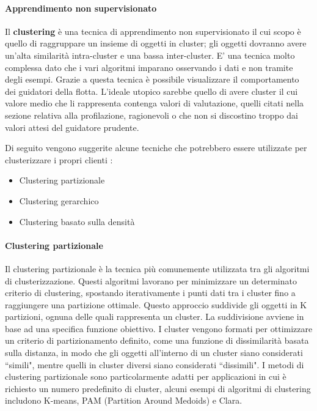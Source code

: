 \documentclass[12pt, a4paper, italian]{report}
\numberwithin{figure}{chapter}
\numberwithin{table}{chapter}
\begin{document}
\paragraph{Apprendimento non supervisionato}
Il \textbf{clustering} è una tecnica di apprendimento non supervisionato il cui scopo è quello di raggruppare un insieme di oggetti in cluster; gli oggetti dovranno avere un'alta similarità intra-cluster e una bassa inter-cluster. E' una tecnica molto complessa dato che i vari algoritmi imparano osservando i dati e non tramite degli esempi. Grazie a questa tecnica è possibile visualizzare il comportamento dei guidatori della flotta. L'ideale utopico sarebbe quello di avere cluster il cui valore medio che li rappresenta contenga valori di valutazione, quelli citati nella sezione relativa alla profilazione, ragionevoli o che non si discostino troppo dai valori attesi del guidatore prudente.

\vspace{0.5cm}
Di seguito vengono suggerite alcune tecniche che potrebbero essere utilizzate per clusterizzare i propri clienti \cite{popat2014review}: 

\begin{itemize}
    \item Clustering partizionale
    \item Clustering gerarchico
    \item Clustering basato sulla densità
\end{itemize}

\paragraph{Clustering partizionale} 
Il clustering partizionale è la tecnica più comunemente utilizzata tra gli algoritmi di clusterizzazione. Questi algoritmi lavorano per minimizzare un determinato criterio di clustering, spostando iterativamente i punti dati tra i cluster fino a raggiungere una partizione ottimale. Questo approccio suddivide gli oggetti in K partizioni, ognuna delle quali rappresenta un cluster. La suddivisione avviene in base ad una specifica funzione obiettivo. I cluster vengono formati per ottimizzare un criterio di partizionamento definito, come una funzione di dissimilarità basata sulla distanza, in modo che gli oggetti all'interno di un cluster siano considerati ``simili", mentre quelli in cluster diversi siano considerati ``dissimili". I metodi di clustering partizionale sono particolarmente adatti per applicazioni in cui è richiesto un numero predefinito di cluster, alcuni esempi di algoritmi di clustering includono K-means, PAM (Partition Around Medoids) e Clara.
\end{document}
